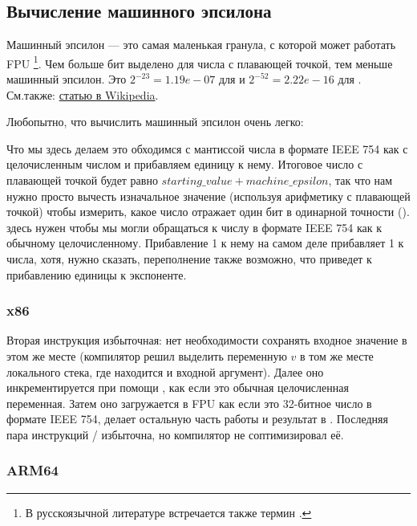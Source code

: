 ﻿\subsection{Вычисление машинного эпсилона}

Машинный эпсилон --- это самая маленькая гранула, с которой может работать \ac{FPU} 
\footnote{В русскоязычной литературе встречается также термин .}.
Чем больше бит выделено для числа с плавающей точкой, тем меньше машинный эпсилон.
Это $2^{-23} = 1.19e-07$ для \Tfloat и $2^{-52} = 2.22e-16$ для \Tdouble.
См.также: \href{http://link.yurichev.com/17368}{статью в Wikipedia}.

Любопытно, что вычислить машинный эпсилон очень легко:



Что мы здесь делаем это обходимся с мантиссой числа в формате IEEE 754 как с целочисленным числом и прибавляем
единицу к нему.
Итоговое число с плавающей точкой будет равно $starting\_value+machine\_epsilon$, так что нам
нужно просто вычесть изначальное значение (используя арифметику с плавающей точкой) чтобы измерить, 
какое число отражает один бит в одинарной точности (\Tfloat).
 здесь нужен чтобы мы могли обращаться к числу в формате IEEE 754 как к обычному целочисленному.
Прибавление 1 к нему на самом деле прибавляет 1 к  числа, хотя, нужно сказать,
переполнение также возможно, что приведет к прибавлению единицы к экспоненте.

\subsubsection{x86}



Вторая инструкция  избыточная: нет необходимости сохранять входное значение в этом же месте
(компилятор решил выделить переменную $v$ в том же месте локального стека, где находится и 
входной аргумент).
Далее оно инкрементируется при помощи , как если это обычная целочисленная переменная.
Затем оно загружается в FPU как если это 32-битное число в формате IEEE 754,  делает остальную
часть работы и результат в .
Последняя пара инструкций / избыточна, но компилятор не соптимизировал её.

\subsubsection{ARM64}

